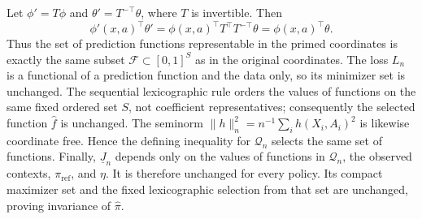 Let \(\phi'=T\phi\) and \(\theta'=T^{-\top}\theta\), where \(T\) is invertible. Then
\[
\phi'(x,a)^\top\theta'=\phi(x,a)^\top T^\top T^{-\top}\theta=\phi(x,a)^\top\theta.
\]
Thus the set of prediction functions representable in the primed coordinates is exactly the same subset \(\mathcal F\subset[0,1]^S\) as in the original coordinates. The loss \(L_n\) is a functional of a prediction function and the data only, so its minimizer set is unchanged. The sequential lexicographic rule orders the values of functions on the same fixed ordered set \(S\), not coefficient representatives; consequently the selected function \(\widehat f\) is unchanged. The seminorm \(\|h\|_n^2=n^{-1}\sum_i h(X_i,A_i)^2\) is likewise coordinate free. Hence the defining inequality for \(\mathcal Q_n\) selects the same set of functions. Finally, \(\underline J_n\) depends only on the values of functions in \(\mathcal Q_n\), the observed contexts, \(\pi_{\mathrm{ref}}\), and \(\eta\). It is therefore unchanged for every policy. Its compact maximizer set and the fixed lexicographic selection from that set are unchanged, proving invariance of \(\widehat\pi\).